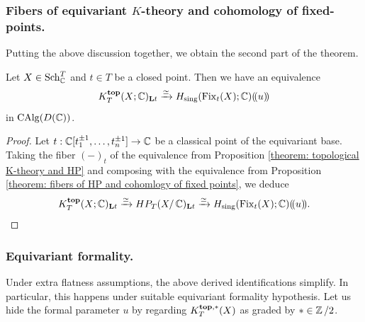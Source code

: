 \subsubsection{Fibers of equivariant $K$-theory and cohomology of fixed-points.}
Putting the above discussion together, we obtain the second part of the theorem.
\begin{proposition}\label{theorem: fibers of equivariant K-theory nd cohomology of fixed points}
    Let $X \in \operatorname{Sch}^T_{\operatorname{\mathbb{C}}}$ and $t \in T$ be a closed point. Then we have an equivalence
\begin{equation*}
    K_T^{\mathbf{top}}(X; \operatorname{\mathbb{C}})_{\mathbf{L} t} \xrightarrow{\simeq} H_{\mathrm{sing}}(\operatorname{Fix}_t(X); \operatorname{\mathbb{C}})(\!( u )\!)
\end{equation*}
in $\operatorname{CAlg}(D(\operatorname{\mathbb{C}}))$.
\end{proposition}
\begin{proof}
Let $t: \operatorname{\mathbb{C}}[t_1^{\pm 1}, \dots, t_n^{\pm 1}] \to \operatorname{\mathbb{C}}$ be a classical point of the equivariant base. Taking the fiber $(-)_t$ of the equivalence from Proposition \ref{theorem: topological K-theory and HP} and composing with the equivalence from Proposition \ref{theorem: fibers of HP and cohomlogy of fixed points}, we deduce
\begin{equation*}
K_T^{\mathbf{top}}(X; \operatorname{\mathbb{C}})_{\mathbf{L} t} \xrightarrow{\simeq} HP_T(X / \operatorname{\mathbb{C}})_{\mathbf{L} t} \xrightarrow{\simeq} H_{\mathrm{sing}}(\operatorname{Fix}_t(X); \operatorname{\mathbb{C}})(\!( u )\!).   
\end{equation*}
\end{proof}

\subsubsection{Equivariant formality.}
Under extra flatness assumptions, the above derived identifications simplify. In particular, this happens under suitable equivariant formality hypothesis. Let us hide the formal parameter $u$ by regarding $K_{T}^{\mathbf{top}, *}(X)$ as graded by $* \in \operatorname{\mathbb{Z}}/2$.

